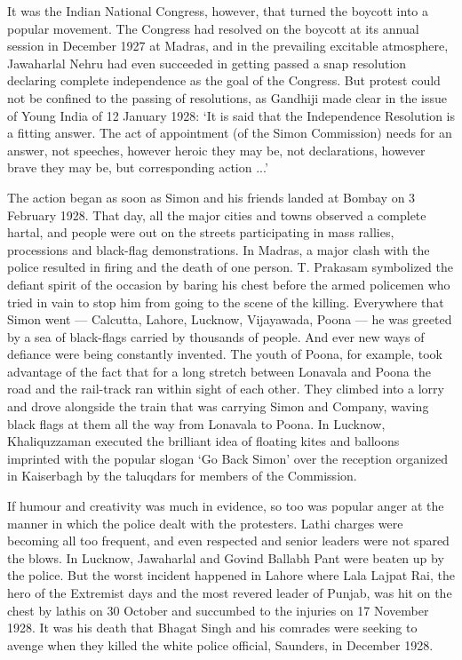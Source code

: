 It was the Indian National Congress, however, that turned the boycott into a popular movement. The Congress had resolved on the boycott at its annual session in December 1927 at Madras, and in the prevailing excitable atmosphere, Jawaharlal Nehru had even succeeded in getting passed a snap resolution declaring complete independence as the goal of the Congress. But protest could not be confined to the passing of resolutions, as Gandhiji made clear in the issue of Young India of 12 January 1928: `It is said that the Independence Resolution is a fitting answer. The act of appointment (of the Simon Commission) needs for an answer, not speeches, however heroic they may be, not declarations, however brave they may be, but corresponding action ...' 

The action began as soon as Simon and his friends landed at Bombay on 3 February 1928. That day, all the major cities and towns observed a complete hartal, and people were out on the streets participating in mass rallies, processions and black-flag demonstrations. In Madras, a major clash with the police resulted in firing and the death of one person. T. Prakasam symbolized the defiant spirit of the occasion by baring his chest before the armed policemen who tried in vain to stop him from going to the scene of the killing. Everywhere that Simon went — Calcutta, Lahore, Lucknow, Vijayawada, Poona — he was greeted by a sea of black-flags carried by thousands of people. And ever new ways of defiance were being constantly invented. The youth of Poona, for example, took advantage of the fact that for a long stretch between Lonavala and Poona the road and the rail-track ran within sight of each other. They climbed into a lorry and drove alongside the train that was carrying Simon and Company, waving black flags at them all the way from Lonavala to Poona. In Lucknow, Khaliquzzaman executed the brilliant idea of floating kites and balloons imprinted with the popular slogan `Go Back Simon' over the reception organized in Kaiserbagh by the taluqdars for members of the Commission. 

If humour and creativity was much in evidence, so too was popular anger at the manner in which the police dealt with the protesters. Lathi charges were becoming all too frequent, and even respected and senior leaders were not spared the blows. In Lucknow, Jawaharlal and Govind Ballabh Pant were beaten up by the police. But the worst incident happened in Lahore where Lala Lajpat Rai, the hero of the Extremist days and the most revered leader of Punjab, was hit on the chest by lathis on 30 October and succumbed to the injuries on 17 November 1928. It was his death that Bhagat Singh and his comrades were seeking to avenge when they killed the white police official, Saunders, in December 1928.

